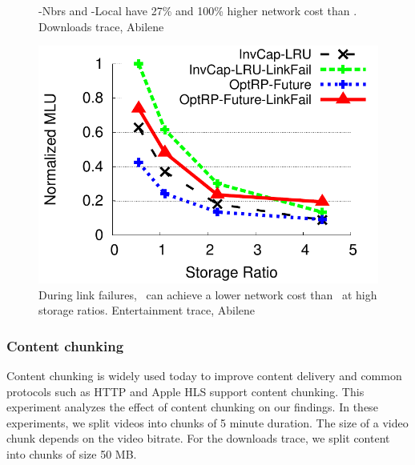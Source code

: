 {\begin{figure}[t]
\begin{minipage}[b]{0.31\linewidth}
\begin{center}
\end{center}
\vspace{-0.25in}
\caption{\textsf{\invlru-Nbrs} and \textsf{\invlru-Local} have 27\% and 100\% higher network cost than \invlru. Downloads trace, Abilene}
\label{fig:lrulocalnew}
\end{minipage}
\hspace{0.3cm}
\begin{minipage}[b]{0.31\linewidth}
\begin{center}
\includegraphics[width=\textwidth]{graphSet1/linkfailurecompare/AbileneVideos.pdf}
\end{center}
\vspace{-0.25in}
\caption{During link failures, \invlru\ can achieve a lower network cost than \optrpfuture\ at high storage ratios. Entertainment trace, Abilene}
\label{fig:linkfailurecompare}
\end{minipage}
\end{figure}
}


\subsubsection{Content chunking}
\label{sec:chunking}
Content chunking is widely used today to improve content delivery and common protocols  such as HTTP \cite{rfc2616} and Apple HLS  \cite{applehls} support content chunking.
This experiment analyzes the effect of content chunking on our findings.  In these experiments, we split videos into chunks of 5 minute duration. The size of a video chunk depends on the video bitrate.  For the downloads trace, we split content into chunks of size 50 MB.

